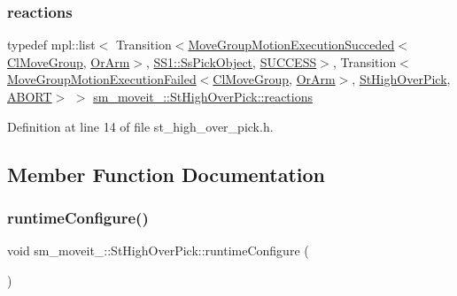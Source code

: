 \subsubsection{\texorpdfstring{reactions}{reactions}}
{\footnotesize\ttfamily typedef mpl\+::list$<$ Transition$<$\hyperlink{structmoveit__z__client_1_1MoveGroupMotionExecutionSucceded}{Move\+Group\+Motion\+Execution\+Succeded}$<$\hyperlink{classmoveit__z__client_1_1ClMoveGroup}{Cl\+Move\+Group}, \hyperlink{classsm__moveit__3_1_1OrArm}{Or\+Arm}$>$, \hyperlink{structsm__moveit__3_1_1SS1_1_1SsPickObject}{S\+S1\+::\+Ss\+Pick\+Object}, \hyperlink{classSUCCESS}{S\+U\+C\+C\+E\+SS}$>$, Transition$<$\hyperlink{structmoveit__z__client_1_1MoveGroupMotionExecutionFailed}{Move\+Group\+Motion\+Execution\+Failed}$<$\hyperlink{classmoveit__z__client_1_1ClMoveGroup}{Cl\+Move\+Group}, \hyperlink{classsm__moveit__3_1_1OrArm}{Or\+Arm}$>$, \hyperlink{structsm__moveit__3_1_1StHighOverPick}{St\+High\+Over\+Pick}, \hyperlink{classABORT}{A\+B\+O\+RT}$>$ $>$ \hyperlink{structsm__moveit__3_1_1StHighOverPick_a040b8ba065c27d3103b57f449a3b637f}{sm\+\_\+moveit\+\_\+::\+St\+High\+Over\+Pick\+::reactions}}



Definition at line 14 of file st\+\_\+high\+\_\+over\+\_\+pick.\+h.



\subsection{Member Function Documentation}
\mbox{\label{structsm__moveit__3_1_1StHighOverPick_ad1cbb7d9d2819d73850de1613b6cad9a}} 
\subsubsection{\texorpdfstring{runtime\+Configure()}{runtimeConfigure()}}
{\footnotesize\ttfamily void sm\+\_\+moveit\+\_\+::\+St\+High\+Over\+Pick\+::runtime\+Configure (\begin{DoxyParamCaption}{ }\end{DoxyParamCaption})\hspace{0.3cm}{\ttfamily [inline]}}



